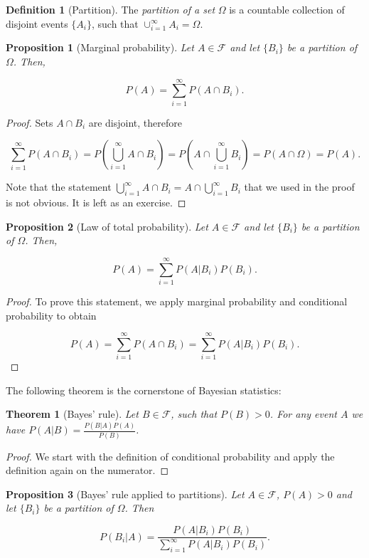 \documentclass{book}
\theoremstyle{plain}%
\newtheorem{theorem}{Theorem}[section]
\newtheorem{proposition}{Proposition}[section]
\theoremstyle{definition}
\newtheorem{definition}{Definition}[section]
\begin{document}
\begin{definition}[Partition]
The \emph{partition of a set} $\Omega$ is a countable collection of disjoint events $\{A_i\}$, such that $\cup_{i=1}^\infty A_i = \Omega$. 
\end{definition}

\begin{proposition}[Marginal probability] Let $A \in \mathcal{F}$ and let $\{B_i\}$ be a partition of $\Omega$. Then,

$$P(A) = \sum_{i=1}^\infty P(A \cap B_i).$$
\end{proposition}

\begin{proof}
Sets $A \cap B_i$ are disjoint, therefore 

$$\sum_{i=1}^\infty P(A \cap B_i) = P(\bigcup_{i=1}^\infty A \cap B_i) = P(A \cap \bigcup_{i=1}^\infty B_i) = P(A \cap \Omega) = P(A).$$

Note that the statement $\bigcup_{i=1}^\infty A \cap B_i = A \cap \bigcup_{i=1}^\infty B_i$ that we used in the proof is not obvious. It is left as an exercise.
\end{proof}

\begin{proposition}[Law of total probability] Let $A \in \mathcal{F}$ and let $\{B_i\}$ be a partition of $\Omega$. Then,

$$P(A) = \sum_{i=1}^\infty P(A|B_i)P(B_i).$$
\end{proposition}

\begin{proof}
To prove this statement, we apply marginal probability and conditional probability to obtain

$$P(A)  = \sum_{i=1}^\infty P(A \cap B_i) = \sum_{i=1}^\infty P(A|B_i)P(B_i).$$
\end{proof}

The following theorem is the cornerstone of Bayesian statistics:

\begin{theorem}[Bayes' rule] Let $B \in \mathcal{F}$, such that $P(B) > 0$. For any event $A$ we have
$P(A|B) = \frac{P(B|A)P(A)}{P(B)}$.
\end{theorem}

\begin{proof}
We start with the definition of conditional probability and apply the definition again on the numerator.
\end{proof}

\begin{proposition}[Bayes' rule applied to partitions] Let $A \in \mathcal{F}$, $P(A) > 0$ and let $\{B_i\}$ be a partition of $\Omega$. Then

$$P(B_i|A) = \frac{P(A|B_i)P(B_i)}{\sum_{i=1}^\infty P(A|B_i)P(B_i)}.$$
\end{proposition}
\end{document}
